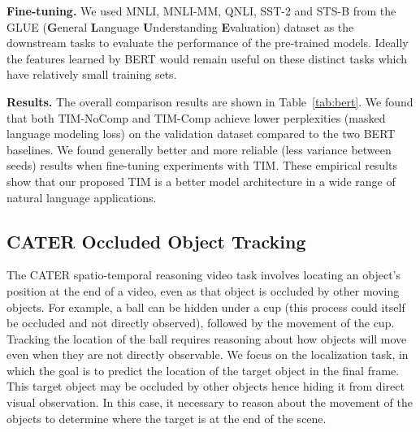 \documentclass{article}
\begin{document}
\textbf{Fine-tuning.} We used MNLI, MNLI-MM, QNLI, SST-2 and STS-B from the GLUE (\textbf{G}eneral \textbf{L}anguage \textbf{U}nderstanding \textbf{E}valuation) dataset \citep{DBLP:journals/corr/abs-1804-07461} as the downstream tasks to evaluate the performance of the pre-trained models.  Ideally the features learned by BERT would remain useful on these distinct tasks which have relatively small training sets.  

\textbf{Results.} The overall comparison results are shown in Table~\ref{tab:bert}. We found that both TIM-NoComp and TIM-Comp achieve lower perplexities (masked language modeling loss) on the validation dataset compared to the two BERT baselines.  We found generally better and more reliable (less variance between seeds) results when fine-tuning experiments with TIM.  These empirical results show that our proposed TIM is a better model architecture in a wide range of natural language applications.








\subsection{CATER Occluded Object Tracking}
\vspace{-1mm}

The CATER spatio-temporal reasoning video task \citep{Gridhar2019Cater} involves locating an object's position at the end of a video, even as that object is occluded by other moving objects.  For example, a ball can be hidden under a cup (this process could itself be occluded and not directly observed), followed by the movement of the cup.  Tracking the location of the ball requires reasoning about how objects will move even when they are not directly observable.  We focus on the localization task, in which the goal is to predict the location of the target object in the final frame. This target object may be occluded by other objects hence hiding it from direct visual observation. In this case, it necessary to reason about the movement of the objects to determine where the target is at the end of the scene.  
\end{document}
